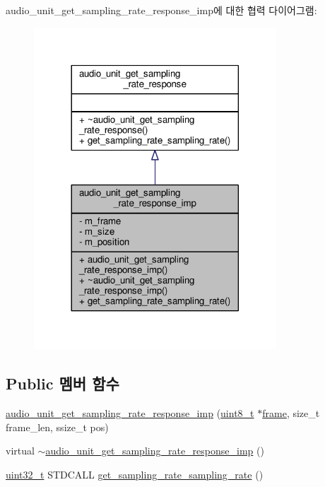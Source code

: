 audio\+\_\+unit\+\_\+get\+\_\+sampling\+\_\+rate\+\_\+response\+\_\+imp에 대한 협력 다이어그램\+:
\nopagebreak
\begin{figure}[H]
\begin{center}
\leavevmode
\includegraphics[width=257pt]{classavdecc__lib_1_1audio__unit__get__sampling__rate__response__imp__coll__graph}
\end{center}
\end{figure}
\subsection*{Public 멤버 함수}
\begin{DoxyCompactItemize}
\item 
\hyperlink{classavdecc__lib_1_1audio__unit__get__sampling__rate__response__imp_a3888d45c381d9ada2a77fc5022c8396d}{audio\+\_\+unit\+\_\+get\+\_\+sampling\+\_\+rate\+\_\+response\+\_\+imp} (\hyperlink{stdint_8h_aba7bc1797add20fe3efdf37ced1182c5}{uint8\+\_\+t} $\ast$\hyperlink{gst__avb__playbin_8c_ac8e710e0b5e994c0545d75d69868c6f0}{frame}, size\+\_\+t frame\+\_\+len, ssize\+\_\+t pos)
\item 
virtual \hyperlink{classavdecc__lib_1_1audio__unit__get__sampling__rate__response__imp_a2816140ffc6e9b41b09db6ab6d17e96a}{$\sim$audio\+\_\+unit\+\_\+get\+\_\+sampling\+\_\+rate\+\_\+response\+\_\+imp} ()
\item 
\hyperlink{parse_8c_a6eb1e68cc391dd753bc8ce896dbb8315}{uint32\+\_\+t} S\+T\+D\+C\+A\+LL \hyperlink{classavdecc__lib_1_1audio__unit__get__sampling__rate__response__imp_a88d3a898cb13a63391a290b5265b7c8f}{get\+\_\+sampling\+\_\+rate\+\_\+sampling\+\_\+rate} ()
\end{DoxyCompactItemize}
